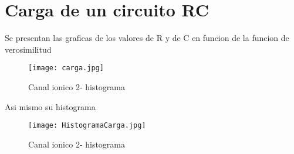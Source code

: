\documentclass{article}
\begin{document}
\section{Carga de un circuito RC}

Se presentan las graficas de los valores de R y de C en funcion de la funcion de verosimilitud 

\begin{figure}[H]
   \centering
    \texttt{[image: carga.jpg]}
    \caption{Canal ionico 2- histograma}
    \label{4}
\end{figure}

Asi mismo su histograma
\begin{figure}[H]
   \centering
    \texttt{[image: HistogramaCarga.jpg]}
    \caption{Canal ionico 2- histograma}
    \label{4}
\end{figure}
\end{document}
